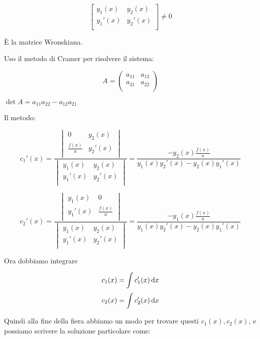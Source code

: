 \[
    \begin{bmatrix}
        y_1(x)  & y_2(x)  \\
        y_1'(x) & y_2'(x) \\
    \end{bmatrix}
    \neq 0
\]

È la matrice Wronskiana.

Uso il metodo di Cramer per risolvere il sistema:

\[
    A = \begin{pmatrix}
        a_{11} & a_{12} \\
        a_{21} & a_{22} \\
    \end{pmatrix}
\]

\(\det A = a_{11} a_{22} - a_{12} a_{21}\)

Il metodo:

\[
    c_1'(x) =
    \frac{
        \begin{vmatrix}
            0              & y_2(x)  \\
            \frac{f(x)}{a} & y_2'(x) \\
        \end{vmatrix}
    }{
        \begin{vmatrix}
            y_1(x)  & y_2(x)  \\
            y_1'(x) & y_2'(x) \\
        \end{vmatrix}
    } = \frac{- y_2(x) \frac{f(x)}{a}}{y_1(x) y_2'(x) - y_2(x) y_1'(x)}
\]

\[
    c_2'(x) =
    \frac{
        \begin{vmatrix}
            y_1(x)  & 0              \\
            y_1'(x) & \frac{f(x)}{a} \\
        \end{vmatrix}
    }{
        \begin{vmatrix}
            y_1(x)  & y_2(x)  \\
            y_1'(x) & y_2'(x) \\
        \end{vmatrix}
    } = \frac{- y_1(x) \frac{f(x)}{a}}{y_1(x) y_2'(x) - y_2(x) y_1'(x)}
\]

\filbreak{}

Ora dobbiamo integrare

\[
    c_1(x) = \int c_1'(x) \mathop{}\!\mathrm{d} x
\]
\[
    c_2(x) = \int c_2'(x) \mathop{}\!\mathrm{d} x
\]

Quindi alla fine della fiera abbiamo un modo per trovare questi \(c_1(x), c_2(x)\), e possiamo scrivere la soluzione particolare come:

